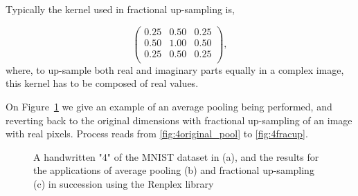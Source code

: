 Typically the kernel used in fractional up-sampling is,

\[
\begin{pmatrix}
	0.25 & 0.50 & 0.25 \\
	0.50 & 1.00 & 0.50 \\
	0.25 & 0.50 & 0.25 \\
\end{pmatrix},
\]
where, to up-sample both real and imaginary parts equally in a complex image, this kernel has to be composed of real values.

On Figure~\ref{fig:4pool} we give an example of an average pooling being performed, and reverting back to the original dimensions with fractional up-sampling of an image with real pixels. Process reads from \ref{fig:4original_pool} to \ref{fig:4fracup}.

\begin{figure}[htbp]
	\centering
	\caption{A handwritten "4" of the MNIST dataset in (a), and the results for the applications of average pooling (b) and fractional up-sampling (c) in succession using the Renplex library}
	\label{fig:4pool}
\end{figure}


